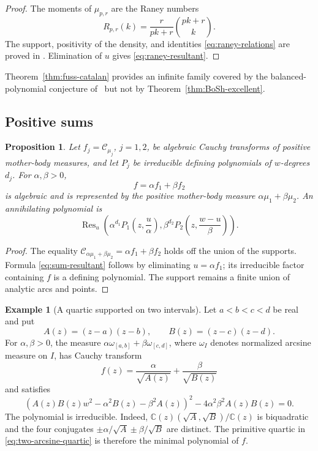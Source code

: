 \documentclass[reqno]{amsart}
\newtheorem{proposition}[theorem]{Proposition}
\theoremstyle{definition}
\newtheorem{example}[theorem]{Example}
\theoremstyle{remark}
\newcommand{\bC}{\mathbb C}
\newcommand{\Cauchy}{\mathcal C}
\begin{document}
\begin{proof}
The moments of $\mu_{p,r}$ are the Raney numbers
\[
 R_{p,r}(k)=\frac{r}{pk+r}\binom{pk+r}{k}.
\]
The support, positivity of the density, and identities
\eqref{eq:raney-relations} are proved in
\cite[(2.1), (2.6), and Proposition~2.1]{ForresterLiu}.  Elimination of $u$
gives \eqref{eq:raney-resultant}.
\end{proof}

Theorem~\ref{thm:fuss-catalan} provides an infinite family covered by the
balanced-polynomial conjecture of~\cite{BoSh} but not by
Theorem~\ref{thm:BoSh-excellent}.

\subsection{Positive sums}

\begin{proposition}\label{prop:positive-sums}
Let $f_j=\Cauchy_{\mu_j}$, $j=1,2$, be algebraic Cauchy transforms of positive
mother-body measures, and let $P_j$ be irreducible defining polynomials of
$w$-degrees $d_j$.  For $\alpha,\beta>0$,
\[
 f=\alpha f_1+\beta f_2
\]
is algebraic and is represented by the positive mother-body measure
$\alpha\mu_1+\beta\mu_2$.  An annihilating polynomial is
\begin{equation}\label{eq:sum-resultant}
 \operatorname{Res}_u\left(
 \alpha^{d_1}P_1\left(z,\frac{u}{\alpha}\right),
 \beta^{d_2}P_2\left(z,\frac{w-u}{\beta}\right)
 \right).
\end{equation}
\end{proposition}

\begin{proof}
The equality
$\Cauchy_{\alpha\mu_1+\beta\mu_2}=\alpha f_1+\beta f_2$ holds off the union of
the supports.  Formula \eqref{eq:sum-resultant} follows by eliminating
$u=\alpha f_1$; its irreducible factor containing $f$ is a defining polynomial.
The support remains a finite union of analytic arcs and points.
\end{proof}

\begin{example}[A quartic supported on two intervals]\label{ex:two-arcsine}
Let $a<b<c<d$ be real and put
\[
 A(z)=(z-a)(z-b),\qquad B(z)=(z-c)(z-d).
\]
For $\alpha,\beta>0$, the measure
$\alpha\omega_{[a,b]}+\beta\omega_{[c,d]}$, where $\omega_I$ denotes normalized
arcsine measure on $I$, has Cauchy transform
\[
 f(z)=\frac{\alpha}{\sqrt{A(z)}}+\frac{\beta}{\sqrt{B(z)}}
\]
and satisfies
\begin{equation}\label{eq:two-arcsine-quartic}
 \left( A(z)B(z)w^2-\alpha^2B(z)-\beta^2A(z)\right)^2
 -4\alpha^2\beta^2A(z)B(z)=0.
\end{equation}
The polynomial is irreducible.  Indeed,
$\bC(z)(\sqrt A,\sqrt B)/\bC(z)$ is biquadratic and the four conjugates
$\pm\alpha/\sqrt A\pm\beta/\sqrt B$ are distinct.  The primitive quartic in
\eqref{eq:two-arcsine-quartic} is therefore the minimal polynomial of $f$.
\end{example}
\end{document}

